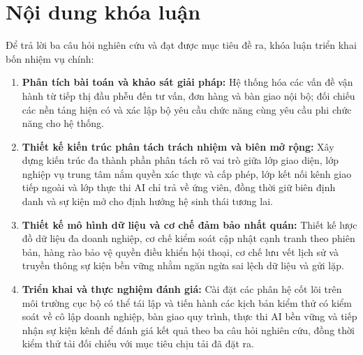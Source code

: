 \section{Nội dung khóa luận}
Để trả lời ba câu hỏi nghiên cứu và đạt được mục tiêu đề ra, khóa luận triển khai bốn nhiệm vụ chính:
\begin{enumerate}
  \item \textbf{Phân tích bài toán và khảo sát giải pháp:} Hệ thống hóa các vấn đề vận hành từ tiếp thị đầu phễu đến tư vấn, đơn hàng và bàn giao nội bộ; đối chiếu các nền tảng hiện có và xác lập bộ yêu cầu chức năng cùng yêu cầu phi chức năng cho hệ thống.
  \item \textbf{Thiết kế kiến trúc phân tách trách nhiệm và biên mở rộng:} Xây dựng kiến trúc đa thành phần phân tách rõ vai trò giữa lớp giao diện, lớp nghiệp vụ trung tâm nắm quyền xác thực và cấp phép, lớp kết nối kênh giao tiếp ngoài và lớp thực thi AI chỉ trả về ứng viên, đồng thời giữ biên định danh và sự kiện mở cho định hướng hệ sinh thái tương lai.
  \item \textbf{Thiết kế mô hình dữ liệu và cơ chế đảm bảo nhất quán:} Thiết kế lược đồ dữ liệu đa doanh nghiệp, cơ chế kiểm soát cập nhật cạnh tranh theo phiên bản, hàng rào bảo vệ quyền điều khiển hội thoại, cơ chế lưu vết lịch sử và truyền thông sự kiện bền vững nhằm ngăn ngừa sai lệch dữ liệu và gửi lặp.
  \item \textbf{Triển khai và thực nghiệm đánh giá:} Cài đặt các phân hệ cốt lõi trên môi trường cục bộ có thể tái lập và tiến hành các kịch bản kiểm thử có kiểm soát về cô lập doanh nghiệp, bàn giao quy trình, thực thi AI bền vững và tiếp nhận sự kiện kênh để đánh giá kết quả theo ba câu hỏi nghiên cứu, đồng thời kiểm thử tải đối chiếu với mục tiêu chịu tải đã đặt ra.
\end{enumerate}

